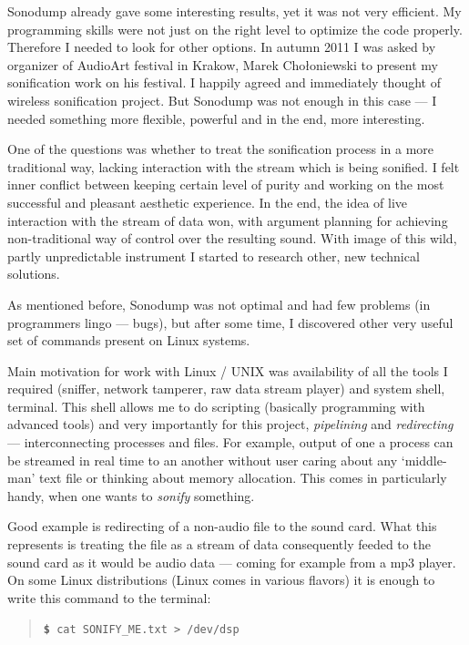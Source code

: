 \documentclass[12pt,a4paper,oneside]{report}
\begin{document}
Sonodump already gave some interesting results, yet it was not very efficient. My programming skills were not just on the right level to optimize the code properly. Therefore I needed to look for other options. In autumn 2011 I was asked by organizer of AudioArt festival in Krakow, Marek Chołoniewski to present my sonification work on his festival. I happily agreed and immediately thought of wireless sonification project. But Sonodump was not enough in this case --- I needed something more flexible, powerful and in the end, more interesting.

One of the questions was whether to treat the sonification process in a more traditional way, lacking interaction with the stream which is being sonified. I felt inner conflict between keeping certain level of purity and working on the most successful and pleasant aesthetic experience. In the end, the idea of live interaction with the stream of data won, with argument planning for achieving non-traditional way of control over the resulting sound. With image of this wild, partly unpredictable instrument I started to research other, new technical solutions.

As mentioned before, Sonodump was not optimal and had few problems (in programmers lingo --- bugs), but after some time, I discovered other very useful set of commands present on Linux systems.

Main motivation for work with Linux / UNIX was availability of all the tools I required (sniffer, network tamperer, raw data stream player) and system shell, terminal. This shell allows me to do scripting (basically programming with advanced tools) and very importantly for this project, \emph{pipelining} and \emph{redirecting} --- interconnecting processes and files. For example, output of one a process can be streamed in real time to an another without user caring about any `middle-man' text file or thinking about memory allocation. This comes in particularly handy, when one wants to \emph{sonify} something. 

Good example is redirecting of a non-audio file to the sound card. What this represents is treating the file as a stream of data consequently feeded to the sound card as it would be audio data --- coming for example from a mp3 player. On some Linux distributions (Linux comes in various flavors) it is enough to write this command to the terminal:
\begin{quotation}
	\texttt{\textbf{\$} cat SONIFY\_ME.txt > /dev/dsp} 
\end{quotation}
\end{document}
